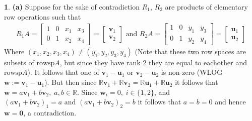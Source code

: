 \documentclass[10.5pt]{article}
\theoremstyle{definition}
\newtheorem{pb}{}
\newcommand{\set}[1]{\{#1\}}
\newcommand{\tand}{\text{ and }}
\newcommand{\tor}{\text{ or }}
\begin{document}
\begin{pb}
    \textbf{(a)}
    Suppose for the sake of contradiction \(R_1\), \(R_2\) are products of elementary row operations such that
    \begin{align*}
        R_1 A = \begin{bmatrix}
            1& 0& x_1& x_3 \\
            0& 1& x_2& x_4
        \end{bmatrix} = \begin{bmatrix} \mathbf{v}_1 \\ \mathbf{v}_2 \end{bmatrix} \tand R_2 A = \begin{bmatrix}
            1& 0& y_1& y_3 \\
            0& 1& y_2& y_4
        \end{bmatrix} = \begin{bmatrix} \mathbf{u}_1 \\ \mathbf{u}_2 \end{bmatrix}
    \end{align*}
    Where \((x_1,x_2,x_3,x_4) \neq (y_1,y_2,y_3,y_4)\) (Note that these two row spaces are subsets of \(\text{rowsp} A\), but since they have rank 2 they are equal to eachother and \(\text{rowsp} A\)). 
    It follows that one of \(\mathbf{v}_1 - \mathbf{u}_1 \tor \mathbf{v}_2 - \mathbf{u}_2\) 
    is non-zero (WLOG \(\mathbf{w} := \mathbf{v}_1 - \mathbf{u}_1\)). But then since \(\mathbb{R}\mathbf{v}_1 + \mathbb{R}\mathbf{v}_2 = \mathbb{R}\mathbf{u}_1 + \mathbb{R}\mathbf{u}_2\) 
    it follows that \(\mathbf{w} = a\mathbf{v}_1 + b\mathbf{v}_2, \; a,b \in \mathbb{R}\). Since \(\mathbf{w}_i = 0, \; i \in \set{1,2}\), and 
    \((a\mathbf{v}_1 + b\mathbf{v}_2)_1 = a \tand (a\mathbf{v}_1 + b\mathbf{v}_2)_2 = b\) it follows that \(a = b = 0\) and hence \(\mathbf{w} = \mathbf{0}\), a contradiction. \newline
    

\end{pb}
\end{document}
